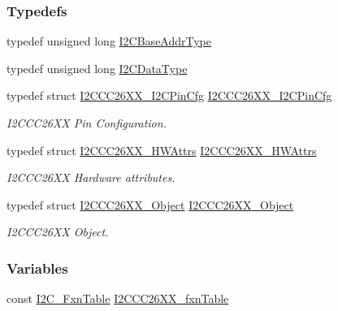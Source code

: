 \subsubsection*{Typedefs}
\begin{DoxyCompactItemize}
\item 
typedef unsigned long \hyperlink{_i2_c_c_c26_x_x_8h_a6e087d828c4463de0061d8205b2245d8}{I2\-C\-Base\-Addr\-Type}
\item 
typedef unsigned long \hyperlink{_i2_c_c_c26_x_x_8h_a5c119be60e1890af18565f27bbb8433a}{I2\-C\-Data\-Type}
\item 
typedef struct \hyperlink{struct_i2_c_c_c26_x_x___i2_c_pin_cfg}{I2\-C\-C\-C26\-X\-X\-\_\-\-I2\-C\-Pin\-Cfg} \hyperlink{_i2_c_c_c26_x_x_8h_a92eeee6e19d215804204c4830a82d424}{I2\-C\-C\-C26\-X\-X\-\_\-\-I2\-C\-Pin\-Cfg}
\begin{DoxyCompactList}\small\item\em I2\-C\-C\-C26\-X\-X Pin Configuration. \end{DoxyCompactList}\item 
typedef struct \hyperlink{struct_i2_c_c_c26_x_x___h_w_attrs}{I2\-C\-C\-C26\-X\-X\-\_\-\-H\-W\-Attrs} \hyperlink{_i2_c_c_c26_x_x_8h_ab3c00c0267b7eb96f1459bfb823bdd79}{I2\-C\-C\-C26\-X\-X\-\_\-\-H\-W\-Attrs}
\begin{DoxyCompactList}\small\item\em I2\-C\-C\-C26\-X\-X Hardware attributes. \end{DoxyCompactList}\item 
typedef struct \hyperlink{struct_i2_c_c_c26_x_x___object}{I2\-C\-C\-C26\-X\-X\-\_\-\-Object} \hyperlink{_i2_c_c_c26_x_x_8h_a0eb1b66d08f9584c404d1610f8282394}{I2\-C\-C\-C26\-X\-X\-\_\-\-Object}
\begin{DoxyCompactList}\small\item\em I2\-C\-C\-C26\-X\-X Object. \end{DoxyCompactList}\end{DoxyCompactItemize}
\subsubsection*{Variables}
\begin{DoxyCompactItemize}
\item 
const \hyperlink{struct_i2_c___fxn_table}{I2\-C\-\_\-\-Fxn\-Table} \hyperlink{_i2_c_c_c26_x_x_8h_a6fb66ad0052e9ab9d1c1b65b8276fc61}{I2\-C\-C\-C26\-X\-X\-\_\-fxn\-Table}
\end{DoxyCompactItemize}


